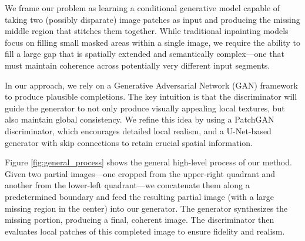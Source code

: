 \documentclass[sigconf]{acmart}
\begin{document}
We frame our problem as learning a conditional generative model capable of taking two (possibly disparate) image patches as input and producing the missing middle region that stitches them together. While traditional inpainting models focus on filling small masked areas within a single image, we require the ability to fill a large gap that is spatially extended and semantically complex—one that must maintain coherence across potentially very different input segments.

In our approach, we rely on a Generative Adversarial Network (GAN) framework to produce plausible completions. The key intuition is that the discriminator will guide the generator to not only produce visually appealing local textures, but also maintain global consistency. We refine this idea by using a PatchGAN discriminator, which encourages detailed local realism, and a U-Net-based generator with skip connections to retain crucial spatial information.

Figure \ref{fig:general_process} shows the general high-level process of our method. Given two partial images—one cropped from the upper-right quadrant and another from the lower-left quadrant—we concatenate them along a predetermined boundary and feed the resulting partial image (with a large missing region in the center) into our generator. The generator synthesizes the missing portion, producing a final, coherent image. The discriminator then evaluates local patches of this completed image to ensure fidelity and realism.
\end{document}
